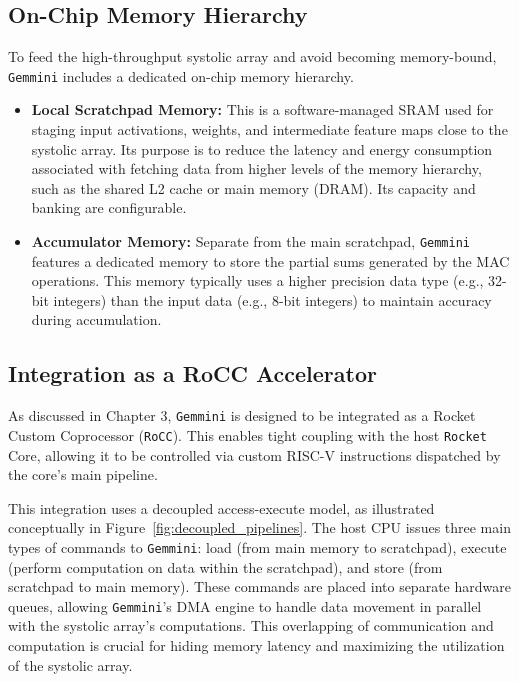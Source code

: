 \subsection{On-Chip Memory Hierarchy}
\label{subsec:gemmini_onchip_mem}

To feed the high-throughput systolic array and avoid becoming memory-bound, \texttt{Gemmini} includes a dedicated on-chip memory hierarchy.
\begin{itemize}
    \item \textbf{Local Scratchpad Memory:} This is a software-managed SRAM used for staging input activations, weights, and intermediate feature maps close to the systolic array. Its purpose is to reduce the latency and energy consumption associated with fetching data from higher levels of the memory hierarchy, such as the shared L2 cache or main memory (DRAM). Its capacity and banking are configurable.
    \item \textbf{Accumulator Memory:} Separate from the main scratchpad, \texttt{Gemmini} features a dedicated memory to store the partial sums generated by the MAC operations. This memory typically uses a higher precision data type (e.g., 32-bit integers) than the input data (e.g., 8-bit integers) to maintain accuracy during accumulation.
\end{itemize}

\subsection{Integration as a RoCC Accelerator}
\label{subsec:gemmini_rocc}

As discussed in Chapter 3, \texttt{Gemmini} is designed to be integrated as a Rocket Custom Coprocessor (\texttt{RoCC}). This enables tight coupling with the host \texttt{Rocket} Core, allowing it to be controlled via custom RISC-V instructions dispatched by the core's main pipeline. 

This integration uses a decoupled access-execute model, as illustrated conceptually in Figure~\ref{fig:decoupled_pipelines}. The host CPU issues three main types of commands to \texttt{Gemmini}: load (from main memory to scratchpad), execute (perform computation on data within the scratchpad), and store (from scratchpad to main memory). These commands are placed into separate hardware queues, allowing \texttt{Gemmini}'s DMA engine to handle data movement in parallel with the systolic array's computations. This overlapping of communication and computation is crucial for hiding memory latency and maximizing the utilization of the systolic array.

